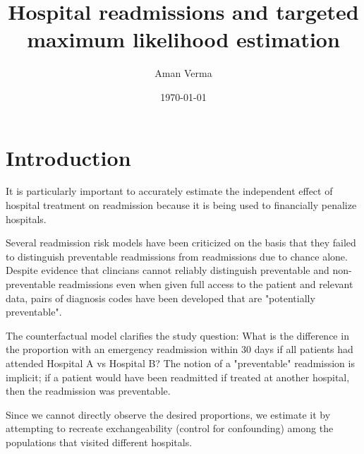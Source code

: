 \documentclass[]{article}\usepackage[]{graphicx}\usepackage[]{color}
\begin{document}
\title{Hospital readmissions and targeted maximum likelihood estimation}
\author{Aman Verma}
\date{\today}


\section{Introduction}
It is particularly important to accurately estimate the independent effect of hospital treatment on readmission because it is being used to financially penalize hospitals.

Several readmission risk models have been criticized on the basis that they failed to distinguish preventable readmissions from readmissions due to chance alone. Despite evidence that clincians cannot reliably distinguish preventable and non-preventable readmissions even when given full access to the patient and relevant data, pairs of diagnosis codes have been developed that are "potentially preventable".

The counterfactual model clarifies the study question: What is the difference in the proportion with an emergency readmission within 30 days if all patients had attended Hospital A vs Hospital B? The notion of a "preventable" readmission is implicit; if a patient would have been readmitted if treated at another hospital, then the readmission was preventable. 

Since we cannot directly observe the desired proportions, we estimate it by attempting to recreate exchangeability (control for confounding) among the populations that visited different hospitals.



\end{document}
